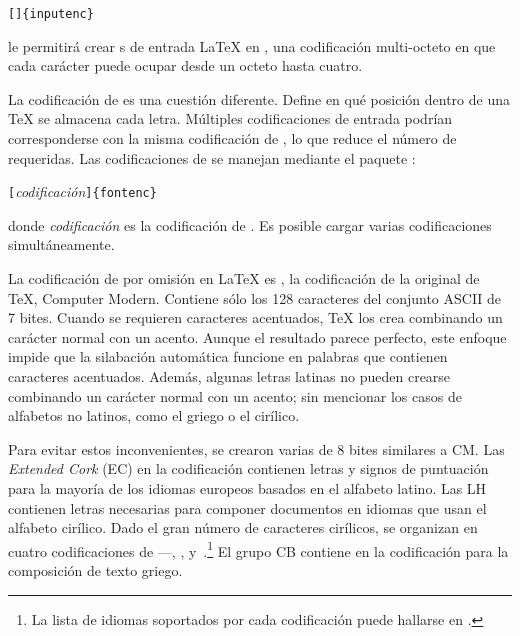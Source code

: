 
\begin{lscommand}
\verb|[|\verb|]{inputenc}| 
\end{lscommand}
le permitirá crear \filenomo{}s de entrada \LaTeX{} en , una codificación multi-octeto en que cada carácter puede ocupar desde un octeto hasta cuatro.

La codificación de \fontsnomo{} es una cuestión diferente.  Define en qué posición dentro de una \fontnomo{} \TeX{} se almacena cada letra. Múltiples codificaciones de entrada podrían corresponderse con la misma codificación de \fontnomo{}, lo que reduce el número de \fontsnomo{} requeridas.  Las codificaciones de \fontnomo{} se manejan mediante el paquete : \label{fontenc}
\begin{lscommand}
\verb|[|\emph{codificación}\verb|]{fontenc}|
\end{lscommand}
donde \emph{codificación} es la codificación de \fontnomo{}. Es posible cargar varias codificaciones simultáneamente.

La codificación de \fontnomo{} por omisión en \LaTeX{} es \label{OT1} , la codificación de la \fontnomo{} original de \TeX{}, Computer Modern.  Contiene sólo los 128 caracteres del conjunto ASCII de 7 bites.  Cuando se requieren caracteres acentuados,  \TeX{} los crea combinando un carácter normal con un acento.  Aunque el resultado parece perfecto, este enfoque impide que la silabación automática funcione en palabras que contienen caracteres acentuados.  Además, algunas letras latinas no pueden crearse combinando un carácter normal con un acento; sin mencionar los casos de alfabetos no latinos, como el griego o el cirílico.

Para evitar estos inconvenientes, se crearon varias \fontsnomo{} de 8 bites similares a CM. Las \fontsnomo{} \emph{Extended Cork} (EC) en la codificación  contienen letras y signos de puntuación para la mayoría de los idiomas europeos basados en el alfabeto latino.  Las \fontsnomo{} LH contienen letras necesarias para componer documentos en idiomas que usan el alfabeto cirílico.  Dado el gran número de caracteres cirílicos, se organizan en cuatro codificaciones de \fontnomo{} ---, ,  y~.\footnote{La lista de idiomas soportados por cada codificación puede hallarse en \cite{cyrguide}.}  El grupo CB contiene \fontsnomo{} en la codificación  para la composición de texto griego.

